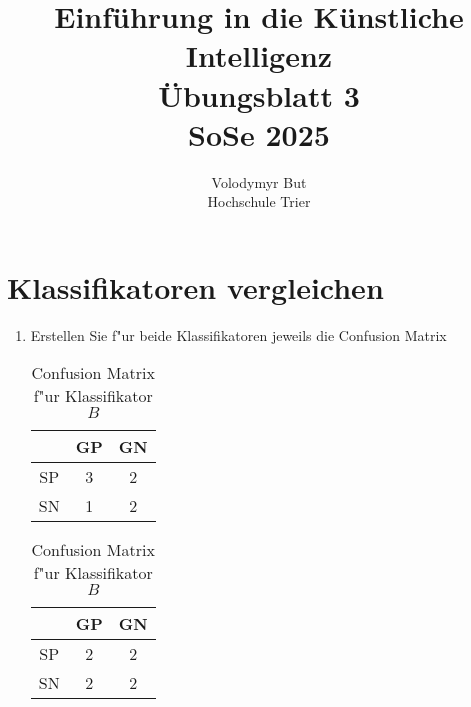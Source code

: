 \documentclass[10pt, oneside]{article}
\title{Einführung in die Künstliche Intelligenz\\[15pt]\Large{Übungsblatt 3}\\[10pt]\Large{SoSe 2025}}
\author{Volodymyr But\\[10pt]Hochschule Trier}
\date{}
\begin{document}
\maketitle
\vspace{25px}

\section{Klassifikatoren vergleichen}

\begin{enumerate}[1.]
    \item Erstellen Sie f"ur beide Klassifikatoren jeweils die Confusion Matrix
        \begin{table}[h]
            \centering
            \begin{minipage}[t]{0.4\linewidth}
                \centering
                \begin{tabular}{|c|c|c|}
                    \hline
                    \  & GP & GN \\
                    \hline
                    SP & 3  & 2  \\
                    \hline
                    SN & 1  & 2  \\
                    \hline
                \end{tabular}
                \caption{Confusion Matrix f"ur Klassifikator $A$}
            \end{minipage}
            \hspace{20px}
            \begin{minipage}[t]{0.4\linewidth}
                \centering
                \begin{tabular}{|c|c|c|}
                    \hline
                    \  & GP & GN \\
                    \hline
                    SP & 2  & 2  \\
                    \hline
                    SN & 2  & 2  \\
                    \hline
                \end{tabular}
                \caption{Confusion Matrix f"ur Klassifikator $B$}
            \end{minipage}
        \end{table}


\end{enumerate}
\end{document}
